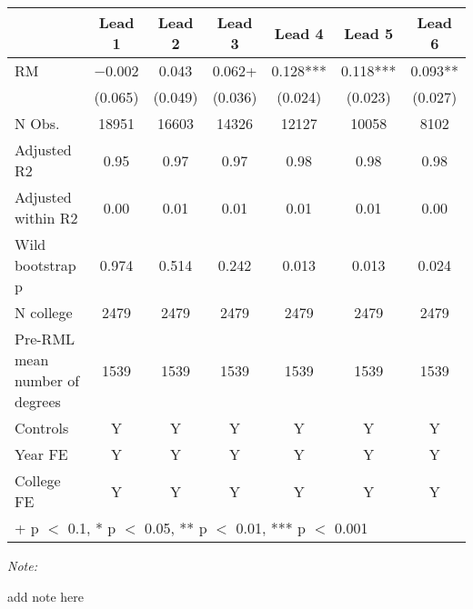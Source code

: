 \begin{table}
\centering
\begin{threeparttable}
\begin{tabular}[t]{lcccccc}
\toprule
  & Lead 1 & Lead 2 & Lead 3 & Lead 4 & Lead 5 & Lead 6\\
\midrule
RM & \num{-0.002} & \num{0.043} & \num{0.062}+ & \num{0.128}*** & \num{0.118}*** & \num{0.093}**\\
 & (\num{0.065}) & (\num{0.049}) & (\num{0.036}) & (\num{0.024}) & (\num{0.023}) & (\num{0.027})\\
\midrule
N Obs. & \num{18951} & \num{16603} & \num{14326} & \num{12127} & \num{10058} & \num{8102}\\
Adjusted R2 & \num{0.95} & \num{0.97} & \num{0.97} & \num{0.98} & \num{0.98} & \num{0.98}\\
Adjusted within R2 & \num{0.00} & \num{0.01} & \num{0.01} & \num{0.01} & \num{0.01} & \num{0.00}\\
Wild bootstrap p & 0.974 & 0.514 & 0.242 & 0.013 & 0.013 & 0.024\\
N college & 2479 & 2479 & 2479 & 2479 & 2479 & 2479\\
Pre-RML mean number of degrees & 1539 & 1539 & 1539 & 1539 & 1539 & 1539\\
Controls & Y & Y & Y & Y & Y & Y\\
Year FE & Y & Y & Y & Y & Y & Y\\
College FE & Y & Y & Y & Y & Y & Y\\
\bottomrule
\multicolumn{7}{l}{\rule{0pt}{1em}+ p $<$ 0.1, * p $<$ 0.05, ** p $<$ 0.01, *** p $<$ 0.001}\\
\end{tabular}
\begin{tablenotes}
\item \textit{Note: } 
\item add note here
\end{tablenotes}
\end{threeparttable}
\end{table}
